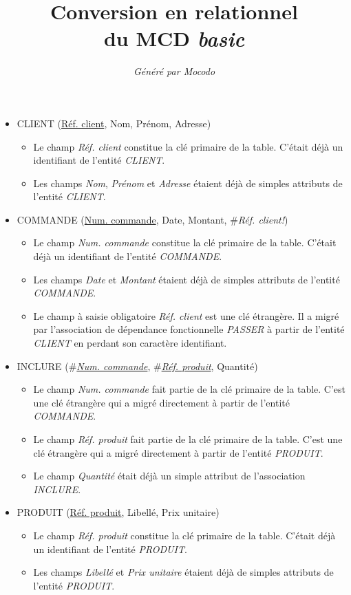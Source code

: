 \documentclass[a4paper]{article}
\title{Conversion en relationnel\\du MCD \emph{basic}}
\author{\emph{Généré par Mocodo}}
\newcommand{\relat}[1]{\textsc{#1}}
\newcommand{\attr}[1]{#1}
\newcommand{\prim}[1]{\uline{#1}}
\newcommand{\foreign}[1]{\#\textsl{#1}}
\begin{document}
\maketitle

\begin{itemize}
  \item \relat{CLIENT} (\prim{Réf. client}, \attr{Nom}, \attr{Prénom}, \attr{Adresse})
  \begin{itemize}
    \item Le champ \emph{Réf. client} constitue la clé primaire de la table. C'était déjà un identifiant de l'entité \emph{CLIENT}.
    \item Les champs \emph{Nom}, \emph{Prénom} et \emph{Adresse} étaient déjà de simples attributs de l'entité \emph{CLIENT}.
  \end{itemize}

  \item \relat{COMMANDE} (\prim{Num. commande}, \attr{Date}, \attr{Montant}, \foreign{Réf. client!})
  \begin{itemize}
    \item Le champ \emph{Num. commande} constitue la clé primaire de la table. C'était déjà un identifiant de l'entité \emph{COMMANDE}.
    \item Les champs \emph{Date} et \emph{Montant} étaient déjà de simples attributs de l'entité \emph{COMMANDE}.
    \item Le champ à saisie obligatoire \emph{Réf. client} est une clé étrangère. Il a migré par l'association de dépendance fonctionnelle \emph{PASSER} à partir de l'entité \emph{CLIENT} en perdant son caractère identifiant.
  \end{itemize}

  \item \relat{INCLURE} (\foreign{\prim{Num. commande}}, \foreign{\prim{Réf. produit}}, \attr{Quantité})
  \begin{itemize}
    \item Le champ \emph{Num. commande} fait partie de la clé primaire de la table. C'est une clé étrangère qui a migré directement à partir de l'entité \emph{COMMANDE}.
    \item Le champ \emph{Réf. produit} fait partie de la clé primaire de la table. C'est une clé étrangère qui a migré directement à partir de l'entité \emph{PRODUIT}.
    \item Le champ \emph{Quantité} était déjà un simple attribut de l'association \emph{INCLURE}.
  \end{itemize}

  \item \relat{PRODUIT} (\prim{Réf. produit}, \attr{Libellé}, \attr{Prix unitaire})
  \begin{itemize}
    \item Le champ \emph{Réf. produit} constitue la clé primaire de la table. C'était déjà un identifiant de l'entité \emph{PRODUIT}.
    \item Les champs \emph{Libellé} et \emph{Prix unitaire} étaient déjà de simples attributs de l'entité \emph{PRODUIT}.
  \end{itemize}

\end{itemize}
\end{document}
